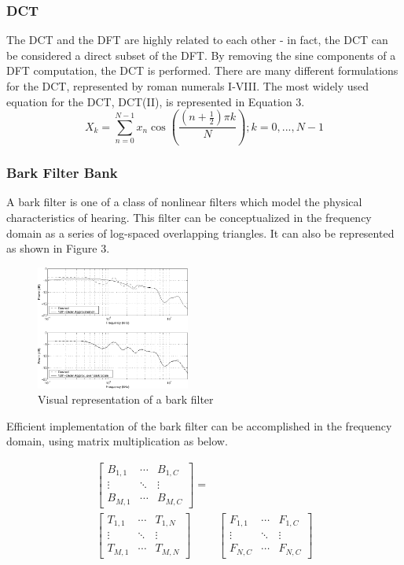 \documentclass[journal]{IEEEtran}
\begin{document}
\subsubsection{DCT}
The DCT and the DFT are highly related to each other - in fact, the DCT can be considered a direct subset of the DFT. By removing the sine components
of a DFT computation, the DCT is performed. There are many different formulations for the DCT, represented by roman numerals I-VIII. The most widely
used equation for the DCT, DCT(II), is represented in Equation 3. \cite{DSPBook}
\begin{equation}
X_k = \sum_{n=0}^{N-1}x_n\cos(\frac{(n + \frac{1}{2})\pi k}{N});k = 0,...,N-1
\end{equation}

\subsubsection{Bark Filter Bank}
A bark filter is one of a class of nonlinear filters which model the physical characteristics of hearing. This filter can be conceptualized in 
the frequency domain as a series of log-spaced overlapping triangles. It can also be represented as shown in Figure 3.

\begin{figure}[h!]
\centering
  \includegraphics[width=0.45\textwidth]{fig3.png}
\caption{Visual representation of a bark filter \cite{AudioBook}}
\end{figure}

Efficient implementation of the bark filter can be accomplished in the frequency domain, using matrix multiplication as below.
\begin{small}
\begin{align}
\begin{bmatrix}
B_{1,1} & \cdots & B_{1,C} \\
\vdots & \ddots & \vdots \\
B_{M,1} & \cdots & B_{M,C} 
\end{bmatrix} = \nonumber \\ 
\begin{bmatrix}
T_{1,1} & \cdots & T_{1,N} \\
\vdots & \ddots & \vdots \\
T_{M,1} & \cdots & T_{M,N}
\end{bmatrix} & 
\begin{bmatrix}
F_{1,1} & \cdots & F_{1,C} \\
\vdots & \ddots & \vdots \\
F_{N,C} & \cdots & F_{N,C}
\end{bmatrix} 
\end{align}
\end{small}
\end{document}
